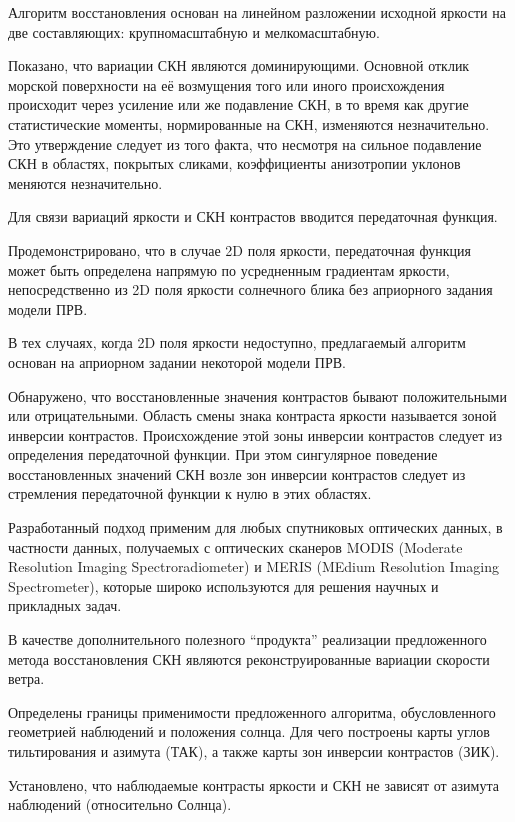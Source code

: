 Алгоритм восстановления основан на линейном разложении исходной яркости на две составляющих: крупномасштабную и мелкомасштабную.

Показано, что вариации СКН являются доминирующими. Основной отклик морской поверхности на её возмущения того или иного происхождения происходит через усиление или же подавление СКН, в то время как другие статистические моменты, нормированные на СКН, изменяются незначительно. Это утверждение следует из того факта, что несмотря на сильное подавление СКН в областях, покрытых сликами, коэффициенты анизотропии уклонов меняются незначительно.

Для связи вариаций яркости и СКН контрастов вводится передаточная функция.

Продемонстрировано, что в случае 2D поля яркости, передаточная функция может быть определена напрямую по усредненным градиентам яркости, непосредственно из 2D поля яркости солнечного блика без априорного задания модели ПРВ.

В тех случаях, когда 2D поля яркости недоступно, предлагаемый алгоритм основан на априорном задании некоторой модели ПРВ.

Обнаружено, что восстановленные значения контрастов бывают положительными или отрицательными. Область смены знака контраста яркости называется зоной инверсии контрастов. Происхождение этой зоны инверсии контрастов следует из определения передаточной функции. При этом сингулярное поведение восстановленных значений СКН возле зон инверсии контрастов следует из стремления передаточной функции к нулю в этих областях.

Разработанный подход применим для любых спутниковых оптических данных, в частности данных, получаемых с оптических сканеров MODIS (Moderate Resolution Imaging Spectroradiometer) и MERIS (MEdium Resolution Imaging Spectrometer), которые широко используются для решения научных и прикладных задач.

В качестве дополнительного полезного ``продукта'' реализации предложенного метода восстановления СКН являются реконструированные вариации скорости ветра.

Определены границы применимости предложенного алгоритма, обусловленного геометрией наблюдений и положения солнца. Для чего построены карты углов тильтирования и азимута (ТАК), а также карты зон инверсии контрастов (ЗИК).

Установлено, что наблюдаемые контрасты яркости и СКН не зависят от азимута наблюдений (относительно Солнца).

